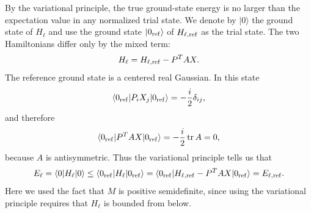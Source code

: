 \documentclass[a4paper,11pt]{article}
\begin{document}
By the variational principle, the true ground-state energy is no larger than the expectation value in any normalized trial state. We denote by $|0\rangle$ the ground state of $H_\ell$ and use the ground state $|0_{\rm ref}\rangle$ of $H_{\ell,{\rm ref}}$ as the trial state. The two Hamiltonians differ only by the mixed term:
\begin{equation}
  H_\ell = H_{\ell,\rm ref}-P^TAX.
\end{equation}
The reference ground state is a centered real Gaussian. In this state
\begin{equation}
  \langle 0_{\rm ref}|P_iX_j|0_{\rm ref}\rangle = -\frac{i}{2}\delta_{ij},
\end{equation}
and therefore
\begin{equation}
  \langle 0_{\rm ref}|P^TAX|0_{\rm ref}\rangle = -\frac{i}{2}\operatorname{tr}A =0,
\end{equation}
because $A$ is antisymmetric. Thus the variational principle tells us that
\begin{equation}
E_\ell = \langle 0|H_\ell|0 \rangle
\leq
\langle 0_{\rm ref}|H_\ell|0_{\rm ref}\rangle
=\langle 0_{\rm ref}|  H_{\ell,{\rm ref}}-P^TAX|0_{\rm ref} \rangle=
E_{\ell,\rm ref}.
\end{equation}
Here we used the fact that $M$ is positive semidefinite, since using the variational principle requires that $H_{\ell}$ is bounded from below. 
\end{document}
